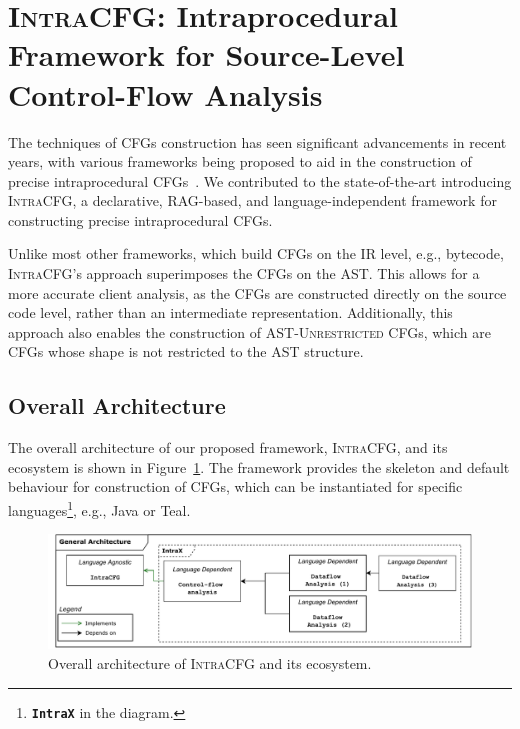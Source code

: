 \section{\textsc{IntraCFG}: Intraprocedural Framework for Source-Level Control-Flow Analysis}%
\label{sec:IntraCFG}
The techniques of CFGs construction has seen significant advancements
in recent years, with various frameworks being proposed to aid in the construction
of precise intraprocedural CFGs~\cite{smits2020flowspec,10.1016/j.scico.2012.02.002}.
We contributed to the state-of-the-art introducing \textsc{IntraCFG}, a declarative, RAG-based,
and language-independent framework for constructing precise intraprocedural CFGs.

Unlike most other frameworks, which build CFGs on the IR level,
e.g.,  bytecode, \textsc{IntraCFG}'s approach superimposes the CFGs
on the AST. This allows for a more accurate client analysis,
as the CFGs are constructed directly on the source code level, rather than an
intermediate representation. Additionally, this approach also enables the construction
of \textsc{AST-Unrestricted} CFGs, which are CFGs whose shape is not restricted to the AST structure.
\subsection{Overall Architecture}
The overall architecture of our proposed framework, \textsc{IntraCFG}, and its
ecosystem is shown in Figure~\ref{fig:intraCFG}.
The framework provides the skeleton and default behaviour for construction of CFGs,
which can be instantiated for specific languages\footnote{\textbf{\texttt{IntraX}} in the diagram.}, e.g., Java or Teal.
\begin{figure}[H]
    \centering
    \includegraphics[width=1\textwidth]{kappa/img/architecture.pdf}
    \caption{\label{fig:intraCFG} Overall architecture of \textsc{IntraCFG} and its ecosystem.}
\end{figure}

